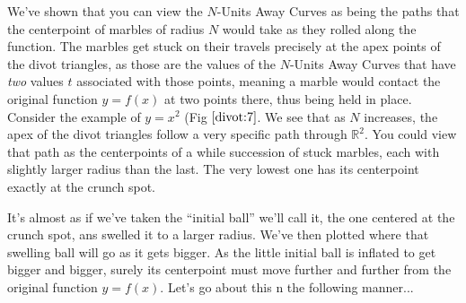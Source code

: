 We've shown that you can view the $N$-Units Away Curves as being the paths that the centerpoint of marbles of radius $N$ would take as they rolled along the function. The marbles get stuck on their travels precisely at the apex points of the divot triangles, as those are the values of the $N$-Units Away Curves that have \textit{two} values $t$ associated with those points, meaning a marble would contact the original function $y = f(x)$ at two points there, thus being held in place. Consider the example of $y = x^2$ (Fig $\ref{divot:7}$. We see that as $N$ increases, the apex of the divot triangles follow a very specific path through $\mathbb{R}^2$. You could view that path as the centerpoints of a while succession of stuck marbles, each with slightly larger radius than the last. The very lowest one has its centerpoint exactly at the crunch spot.

It's almost as if we've taken the ``initial ball'' we'll call it, the one centered at the crunch spot, ans swelled it to a larger radius. We've then plotted where that swelling ball will go as it gets bigger. As the little initial ball is inflated to get bigger and bigger, surely its centerpoint must move further and further from the original function $y = f(x)$. Let's go about this n the following manner...

\renewcommand\w{0.4\textwidth}
\renewcommand\fw{0.9\linewidth}
\renewcommand\fh{0.2\textheight}

